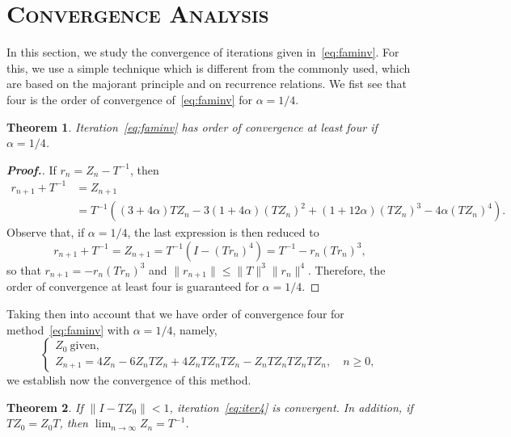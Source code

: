 \documentclass[11pt,twoside,letterpaper]{article} %
\newtheorem{theorem}{Theorem}
\begin{document}
\section{\scshape Convergence Analysis}

In this section, we study the convergence of iterations given in~\eqref{eq:faminv}. For this, we use a simple technique which is different from the commonly used, which are based on the majorant principle and on recurrence relations. We fist see that four is the order of convergence of~\eqref{eq:faminv} for $\alpha=1/4$.

\begin{theorem}
Iteration~\eqref{eq:faminv} has order of convergence at least four if $\alpha=1/4$.
\end{theorem}

\begin{proof}[\normalfont\textbf{Proof.}]
If ${r}_n=Z_n-T^{-1}$, then
\begin{align*}
{r}_{n+1}+T^{-1} &= Z_{n+1} \\
&= T^{-1}\left(
(3+4\alpha)TZ_{n}-3(1+4\alpha)(TZ_{n})^{2}+(1+12\alpha)(TZ_{n})^{3}-4\alpha(TZ_{n})^{4}\right).
\end{align*}
Observe that, if $\alpha=1/4$, the last expression is then reduced to
$$
{r}_{n+1}+T^{-1} = Z_{n+1}
= T^{-1}\left(I-(T{r}_n)^{4}\right)
= T^{-1}-{r}_n(T{r}_n)^{3},
$$
so that ${r}_{n+1}=-{r}_n(T{r}_n)^3$ and
$\|{r}_{n+1}\| \leq \|T\|^3\|{r}_n\|^4$.
Therefore, the order of convergence at least four is guaranteed for $\alpha=1/4$.
\end{proof}

Taking then into account that we have order of convergence four for method~\eqref{eq:faminv} with $\alpha=1/4$, namely,
\begin{equation}
\label{eq:iter4}
\left\{
\begin{array}{l}
Z_0\ \text{given}, \\[1ex]
Z_{n+1} = 4Z_n-6Z_nTZ_n+4Z_nTZ_nTZ_n-Z_nTZ_nTZ_nTZ_n,
\quad n\geq 0,
\end{array}
\right.
\end{equation}
we establish now the convergence of this method.

\begin{theorem}
\label{th:conv}
If $\|I-TZ_0\|<1$, iteration~\eqref{eq:iter4} is convergent.
In addition, if $TZ_0=Z_0T$, then $\lim_{n\rightarrow\infty}Z_n=T^{-1}$.
\end{theorem}
\end{document}
